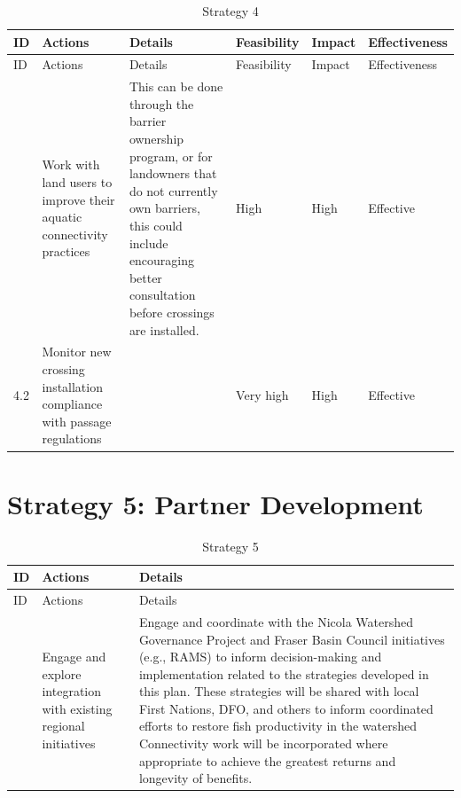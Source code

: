 \documentclass[
  letterpaper,
  DIV=11,
  numbers=noendperiod]{scrreprt}
\begin{document}
\hypertarget{tbl-S4}{}
\begin{longtable}[]{@{}llllll@{}}
\caption{\label{tbl-S4}Strategy 4}\label{T_54493}\tabularnewline
\toprule\noalign{}
ID & Actions & Details & Feasibility & Impact & Effectiveness \\
\midrule\noalign{}
\endfirsthead
\toprule\noalign{}
ID & Actions & Details & Feasibility & Impact & Effectiveness \\
\midrule\noalign{}
\endhead
\bottomrule\noalign{}
\endlastfoot
4.1 & Work with land users to improve their aquatic connectivity
practices & This can be done through the barrier ownership program, or
for landowners that do not currently own barriers, this could include
encouraging better consultation before crossings are installed. & High &
High & Effective \\
4.2 & Monitor new crossing installation compliance with passage
regulations & & Very high & High & Effective \\
\end{longtable}

\hypertarget{strategy-5-partner-development}{%
\section*{Strategy 5: Partner
Development}\label{strategy-5-partner-development}}


\hypertarget{tbl-S5}{}
\begin{longtable}[]{@{}lll@{}}
\caption{\label{tbl-S5}Strategy 5}\label{T_1994d}\tabularnewline
\toprule\noalign{}
ID & Actions & Details \\
\midrule\noalign{}
\endfirsthead
\toprule\noalign{}
ID & Actions & Details \\
\midrule\noalign{}
\endhead
\bottomrule\noalign{}
\endlastfoot
5.1 & Engage and explore integration with existing regional initiatives
& Engage and coordinate with the Nicola Watershed Governance Project and
Fraser Basin Council initiatives (e.g., RAMS) to inform decision-making
and implementation related to the strategies developed in this plan.
These strategies will be shared with local First Nations, DFO, and
others to inform coordinated efforts to restore fish productivity in the
watershed Connectivity work will be incorporated where appropriate to
achieve the greatest returns and longevity of benefits. \\
\end{longtable}
\end{document}
